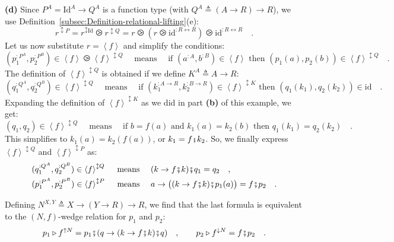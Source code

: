 \textbf{(d)} Since $P^{A}=\text{Id}^{A}\rightarrow Q^{A}$ is a function
type (with $Q^{A}\triangleq\left(A\rightarrow R\right)\rightarrow R$),
we use Definition~\ref{subsec:Definition-relational-lifting}(e):
\[
r^{\updownarrow P}=r^{\updownarrow\text{Id}}\ogreaterthan r^{\updownarrow Q}=r\ogreaterthan(r\ogreaterthan\text{id}^{:R\leftrightarrow R})\ogreaterthan\text{id}^{:R\leftrightarrow R}\quad.
\]
Let us now substitute $r=\left<f\right>$ and simplify the conditions:
\[
(p_{1}^{:P^{A}},p_{2}^{:P^{B}})\in\left<f\right>\ogreaterthan\left<f\right>^{\updownarrow Q}\quad\text{ means }\quad\text{if }(a^{:A},b^{:B})\in\left<f\right>\text{ then }(p_{1}(a),p_{2}(b))\in\left<f\right>^{\updownarrow Q}\quad.
\]
The definition of $\left<f\right>^{\updownarrow Q}$ is obtained if
we define $K^{A}\triangleq A\rightarrow R$:
\[
(q_{1}^{:Q^{A}},q_{2}^{:Q^{B}})\in\left<f\right>^{\updownarrow Q}\quad\text{ means }\quad\text{if }(k_{1}^{:A\rightarrow R},k_{2}^{:B\rightarrow R})\in\left<f\right>^{\updownarrow K}\text{ then }(q_{1}(k_{1}),q_{2}(k_{2}))\in\text{id}\quad.
\]
Expanding the definition of $\left<f\right>^{\updownarrow K}$ as
we did in part \textbf{(b)} of this example, we get:
\[
(q_{1},q_{2})\in\left<f\right>^{\updownarrow Q}\quad\text{ means }\quad\text{if }b=f(a)\text{ and }k_{1}(a)=k_{2}(b)\text{ then }q_{1}(k_{1})=q_{2}(k_{2})\quad.
\]
This simplifies to $k_{1}(a)=k_{2}(f(a))$, or $k_{1}=f\bef k_{2}$.
So, we finally express $\left<f\right>^{\updownarrow Q}$ and $\left<f\right>^{\updownarrow P}$
as:
\begin{align*}
 & (q_{1}^{:Q^{A}},q_{2}^{:Q^{B}})\in\left<f\right>^{\updownarrow Q}\quad\text{ means }\quad(k\rightarrow f\bef k)\bef q_{1}=q_{2}\quad,\\
 & (p_{1}^{:P^{A}},p_{2}^{:P^{B}})\in\left<f\right>^{\updownarrow P}\quad\text{ means }\quad a\rightarrow\big((k\rightarrow f\bef k)\bef p_{1}(a)\big)=f\bef p_{2}\quad.
\end{align*}

Defining $N^{X,Y}\triangleq X\rightarrow\left(Y\rightarrow R\right)\rightarrow R$,
we find that the last formula is equivalent to the $\left(N,f\right)$-wedge
relation for $p_{1}$ and $p_{2}$:
\[
p_{1}\triangleright f^{\uparrow N}=p_{1}\bef(q\rightarrow(k\rightarrow f\bef k)\bef q)\quad,\quad\quad p_{2}\triangleright f^{\downarrow N}=f\bef p_{2}\quad.
\]

